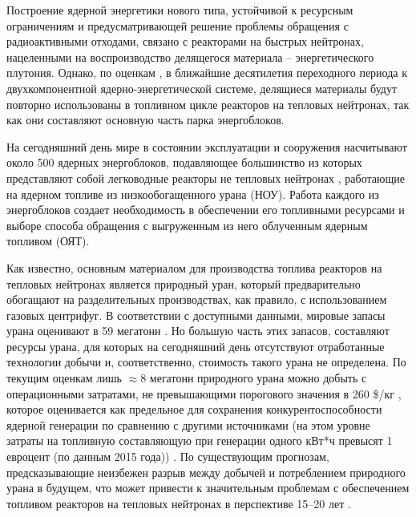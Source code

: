 {\actuality}

Построение ядерной энергетики нового типа, устойчивой к ресурсным ограничениям и предусматривающей решение проблемы обращения с радиоактивными отходами, связано с реакторами на быстрых нейтронах, нацеленными на воспроизводство делящегося материала -- энергетического  плутония. Однако, по оценкам \cite{andrianovaPerspektivnyeToplivnyeZagruzki2015}, в ближайшие десятилетия переходного периода к двухкомпонентной ядерно-энергетической системе, делящиеся материалы будут повторно использованы в топливном цикле реакторов на тепловых нейтронах, так как они составляют основную часть парка энергоблоков.

На сегодняшний день мире в состоянии эксплуатации и сооружения насчитывают около 500 ядерных энергоблоков, подавляющее большинство из которых представляют собой легководные реакторы не тепловых нейтронах \cite{PRISHome}, работающие на ядерном топливе из низкообогащенного урана (НОУ). Работа каждого из энергоблоков создает необходимость в обеспечении его топливными ресурсами и выборе способа обращения с выгруженным из него облученным ядерным топливом (ОЯТ).

Как известно, основным материалом для производства топлива реакторов на тепловых нейтронах является природный уран, который предварительно обогащают на разделительных производствах, как правило, с использованием газовых центрифуг. В соответствии с доступными данными, мировые запасы урана  оценивают в 59 мегатонн \cite{/content/publication/d82388ab-en}. Но большую часть этих запасов, составляют ресурсы урана, для которых на сегодняшний день отсутствуют отработанные технологии добычи и, соответственно, стоимость такого урана не определена. По текущим оценкам лишь $\approx$8 мегатонн природного урана можно добыть с операционными затратами, не превышающими порогового значения в 260 \$/кг \cite{WorldDistributionUranium2018}, которое оценивается как предельное для сохранения конкурентоспособности ядерной генерации по сравнению с другими источниками (на этом уровне затраты на топливную составляющую при генерации одного кВт*ч превысят 1 евроцент (по данным 2015 года)) \cite{hartardCompetitionConflictsResource2015}. По существующим прогнозам, предсказывающие неизбежен разрыв между добычей и потреблением природного урана в будущем, что может привести к значительным проблемам  с обеспечением топливом реакторов на тепловых нейтронах в перспективе 15--20 лет \cite{international2019iaea}.

